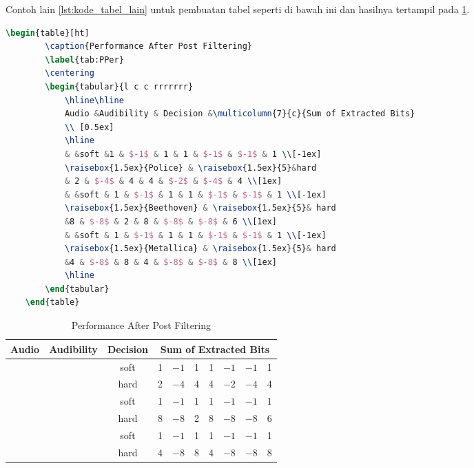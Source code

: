 Contoh lain \cref{lst:kode_tabel_lain} untuk pembuatan tabel seperti di bawah ini dan hasilnya tertampil pada \cref{tab:PPer}.

\begin{lstlisting}[language=TeX, caption=Kode untuk Membuat Tabel dalam Dokumen, label=lst:kode_tabel_lain]
    \begin{table}[ht]
        \caption{Performance After Post Filtering}
        \label{tab:PPer}
        \centering
        \begin{tabular}{l c c rrrrrrr}
            \hline\hline
            Audio &Audibility & Decision &\multicolumn{7}{c}{Sum of Extracted Bits} 
            \\ [0.5ex] 
            \hline
            & &soft &1 & $-1$ & 1 & 1 & $-1$ & $-1$ & 1 \\[-1ex]
            \raisebox{1.5ex}{Police} & \raisebox{1.5ex}{5}&hard
            & 2 & $-4$ & 4 & 4 & $-2$ & $-4$ & 4 \\[1ex]
            & &soft & 1 & $-1$ & 1 & 1 & $-1$ & $-1$ & 1 \\[-1ex]
            \raisebox{1.5ex}{Beethoven} & \raisebox{1.5ex}{5}& hard
            &8 & $-8$ & 2 & 8 & $-8$ & $-8$ & 6 \\[1ex]
            & &soft & 1 & $-1$ & 1 & 1 & $-1$ & $-1$ & 1 \\[-1ex]
            \raisebox{1.5ex}{Metallica} & \raisebox{1.5ex}{5}& hard
            &4 & $-8$ & 8 & 4 & $-8$ & $-8$ & 8 \\[1ex]
            \hline
        \end{tabular}
    \end{table}
\end{lstlisting}

\begin{table}[ht]
	\caption{Performance After Post Filtering}
	\label{tab:PPer}
	\centering
	\begin{tabular}{l c c rrrrrrr}
		\hline\hline
		Audio &Audibility & Decision &\multicolumn{7}{c}{Sum of Extracted Bits} 
		\\ [0.5ex] 
		\hline
		& &soft &1 & $-1$ & 1 & 1 & $-1$ & $-1$ & 1 \\[-1ex]
		\raisebox{1.5ex}{Police} & \raisebox{1.5ex}{5}&hard
		& 2 & $-4$ & 4 & 4 & $-2$ & $-4$ & 4 \\[1ex]
		& &soft & 1 & $-1$ & 1 & 1 & $-1$ & $-1$ & 1 \\[-1ex]
		\raisebox{1.5ex}{Beethoven} & \raisebox{1.5ex}{5}& hard
		&8 & $-8$ & 2 & 8 & $-8$ & $-8$ & 6 \\[1ex]
		& &soft & 1 & $-1$ & 1 & 1 & $-1$ & $-1$ & 1 \\[-1ex]
		\raisebox{1.5ex}{Metallica} & \raisebox{1.5ex}{5}& hard
		&4 & $-8$ & 8 & 4 & $-8$ & $-8$ & 8 \\[1ex]
		\hline
	\end{tabular}
\end{table}

